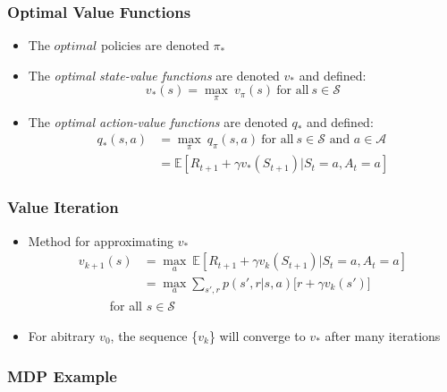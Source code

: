 \documentclass{beamer}
\begin{document}

\begin{frame}
\frametitle{Optimal Value Functions}
\begin{itemize}
\item The $optimal$ policies are denoted $\pi_{\ast}$
\item The \textit{optimal state-value functions} are denoted $v_{\ast}$ and defined:
\begin{equation}
v_{\ast}(s) = \underset{\pi}{\max} \ v_\pi(s) \ \textrm{for all} \ s \in \mathscr{S}
\nonumber
\end{equation}
\item The \textit{optimal action-value functions} are denoted $q_{\ast}$ and defined:
\begin{align*}
q_{\ast}(s,a) &= \underset{\pi}{\max} \ q_\pi(s,a) \ \textrm{for all} \ s \in \mathscr{S} \textrm{ and } a \in \mathscr{A} \\
&= \mathbb{E}[R_{t+1} + \gamma v_{\ast}(S_{t+1}) | S_t = a, A_t = a]
\nonumber
\end{align*}
\end{itemize}
\end{frame}



\begin{frame}
\frametitle{Value Iteration}
\begin{itemize}
\item Method for approximating $v_{\ast}$
\begin{align*}
v_{k+1}(s) &= \underset{a}{\max} \ \mathbb{E}[R_{t+1} + \gamma v_{k}(S_{t+1}) | S_t = a, A_t = a] \\
&= \underset{a}{\max} \sum_{s',r} p(s',r|s,a) \big[ r + \gamma v_k(s') \big]
\nonumber
\end{align*}
\ \ \ \ \ \ \ \ \ \ \ \ \ for all $s \in \mathscr{S}$
\item For abitrary $v_0$, the sequence \{$v_k$\} will converge to $v_*$ after many iterations
\end{itemize}
\end{frame}

\begin{frame}
\frametitle{MDP Example}

\end{frame}



%
%

\end{document}
